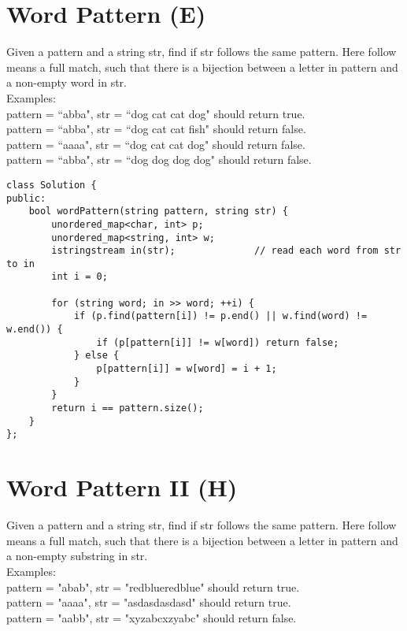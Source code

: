 \section{Word Pattern (E)}
Given a pattern and a string str, find if str follows the same pattern. Here follow means a full match, such that there is a bijection between a letter in pattern and a non-empty word in str. \\

Examples:\\
    pattern = ``abba", str = ``dog cat cat dog" should return true.\\
    pattern = ``abba", str = ``dog cat cat fish" should return false.\\
    pattern = ``aaaa", str = ``dog cat cat dog" should return false.\\
    pattern = ``abba", str = ``dog dog dog dog" should return false.\\

\begin{lstlisting}
class Solution {
public:
    bool wordPattern(string pattern, string str) {
        unordered_map<char, int> p;
        unordered_map<string, int> w;
        istringstream in(str);              // read each word from str to in
        int i = 0;
        
        for (string word; in >> word; ++i) {
            if (p.find(pattern[i]) != p.end() || w.find(word) != w.end()) {
                if (p[pattern[i]] != w[word]) return false;
            } else {
                p[pattern[i]] = w[word] = i + 1;
            }
        }
        return i == pattern.size();
    }
};
\end{lstlisting}


\section{Word Pattern II (H)}
Given a pattern and a string str, find if str follows the same pattern. Here follow means a full match, such that there is a bijection between a letter in pattern and a non-empty substring in str.\\

Examples:\\
    pattern = "abab", str = "redblueredblue" should return true.\\
    pattern = "aaaa", str = "asdasdasdasd" should return true.\\
    pattern = "aabb", str = "xyzabcxzyabc" should return false.\\


